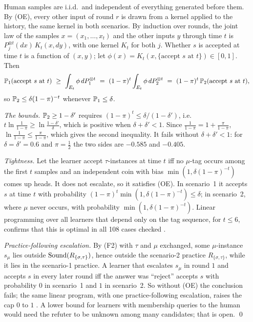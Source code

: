 Human samples are i.i.d.\ and independent of everything generated before them. By (OE), every other input of round $r$ is drawn from a kernel applied to the history, the same kernel in both scenarios. By induction over rounds, the joint law of the samples $x=(x_1,\dots,x_t)$ and the other inputs $y$ through time $t$ is $P_j^{\otimes t}(dx)\,K_t(x,dy)$, with one kernel $K_t$ for both $j$. Whether $s$ is accepted at time $t$ is a function of $(x,y)$; let $\phi(x)=K_t(x,\{\text{accept }s\text{ at }t\})\in[0,1]$. Then
\[
\Prob_1(\text{accept }s\text{ at }t)\ \ge\ \int_{E_t}\phi\,dP_1^{\otimes t}\ =\ (1-\pi)^t\int_{E_t}\phi\,dP_2^{\otimes t}\ =\ (1-\pi)^t\,\Prob_2(\text{accept }s\text{ at }t),
\]
so $\mathbb{P}_2\le\delta(1-\pi)^{-t}$ whenever $\mathbb{P}_1\le\delta$.

\emph{The bounds.} $\mathbb{P}_2\ge1-\delta'$ requires $(1-\pi)^t\le\delta/(1-\delta')$, i.e.\ $t\ln\frac1{1-\pi}\ge\ln\frac{1-\delta'}\delta$, which is positive when $\delta+\delta'<1$. Since $\frac1{1-\pi}=1+\frac\pi{1-\pi}$, $\ln\frac1{1-\pi}\le\frac\pi{1-\pi}$, which gives the second inequality. It fails without $\delta+\delta'<1$: for $\delta=\delta'=0.6$ and $\pi=\frac12$ the two sides are $-0.585$ and $-0.405$.

\emph{Tightness.} Let the learner accept $\tau$-instances at time $t$ iff no $\mu$-tag occurs among the first $t$ samples and an independent coin with bias $\min(1,\delta(1-\pi)^{-t})$ comes up heads. It does not escalate, so it satisfies (OE). In scenario~1 it accepts $s$ at time $t$ with probability $(1-\pi)^t\min(1,\delta(1-\pi)^{-t})\le\delta$; in scenario~2, where $\mu$ never occurs, with probability $\min(1,\delta(1-\pi)^{-t})$. Linear programming over all learners that depend only on the tag sequence, for $t\le6$, confirms that this is optimal in all 108 cases checked .

\emph{Practice-following escalation.} By (F2) with $\tau$ and $\mu$ exchanged, some $\mu$-instance $s_\mu$ lies outside $\mathrm{Sound}(R_{\{\sigma,\tau\}})$, hence outside the scenario-2 practice $R_{\{\sigma,\tau\}}$, while it lies in the scenario-1 practice. A learner that escalates $s_\mu$ in round $1$ and accepts $s$ in every later round iff the answer was ``reject'' accepts $s$ with probability $0$ in scenario~1 and $1$ in scenario~2. So without (OE) the conclusion fails; the same linear program, with one practice-following escalation, raises the cap $0$ to $1$ . A lower bound for learners with membership queries to the human would need the refuter to be unknown among many candidates; that is open. \qed

